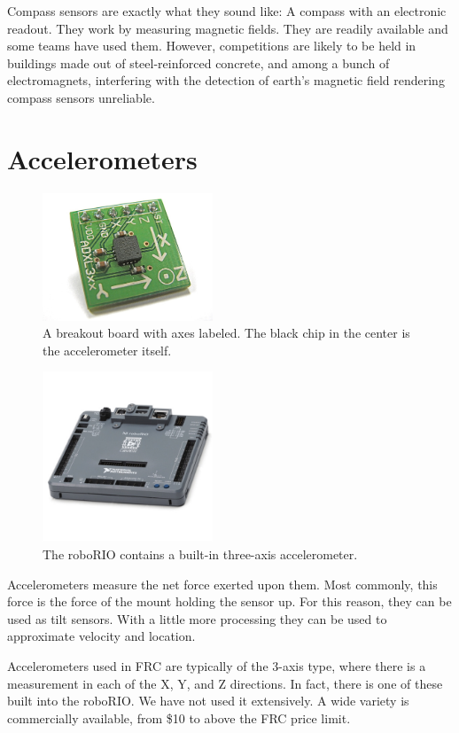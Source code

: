 \documentclass{article}
\begin{document}
Compass sensors are exactly what they sound like: A compass with an electronic readout.  They work by measuring magnetic fields.  They are readily available and some teams have used them.  However, competitions are likely to be held in buildings made out of steel-reinforced concrete, and among a bunch of electromagnets, interfering with the detection of earth's magnetic field rendering compass sensors unreliable.

\section{Accelerometers}
\begin{figure}[ht]
\centering
\includegraphics[width=2in]{accelerometer.jpg}
\caption{A breakout board with axes labeled.  The black chip in the center is the accelerometer itself.}
\end{figure}

\begin{figure}[ht]
\centering
\includegraphics[width=2in]{roborio.jpg}
\caption{The roboRIO contains a built-in three-axis accelerometer.}
\end{figure}

Accelerometers measure the net force exerted upon them.  Most commonly, this force is the force of the mount holding the sensor up.  For this reason, they can be used as tilt sensors.  With a little more processing they can be used to approximate velocity and location.  

Accelerometers used in FRC are typically of the 3-axis type, where there is a measurement in each of the X, Y, and Z directions.  In fact, there is one of these built into the roboRIO.  We have not used it extensively.  A wide variety is commercially available, from \$10 to above the FRC price limit.  
\end{document}
